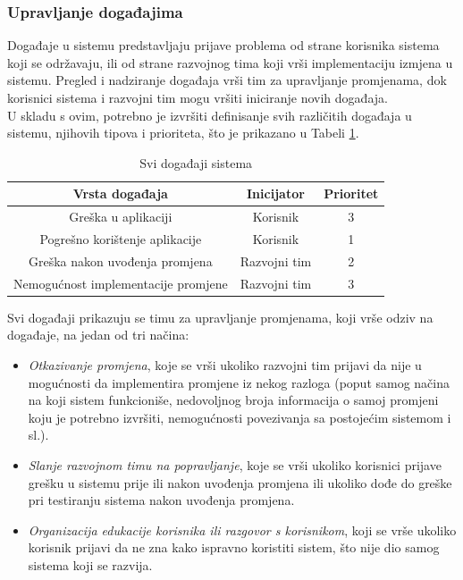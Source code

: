 \documentclass[12pt,a4paper]{article}
\begin{document}
\subsubsection{Upravljanje događajima}

\quad Događaje u sistemu predstavljaju prijave problema od strane korisnika sistema koji se održavaju, ili od strane razvojnog tima koji vrši implementaciju izmjena u sistemu. Pregled i nadziranje događaja vrši tim za upravljanje promjenama, dok korisnici sistema i razvojni tim mogu vršiti iniciranje novih događaja. \\

U skladu s ovim, potrebno je izvršiti definisanje svih različitih događaja u sistemu, njihovih tipova i prioriteta, što je prikazano u Tabeli \ref{tabela1}.

\begin{table}[H]
\centering
\begin{tabular}{| c | c | c |} \hline
\cellcolor{gray!25}\textbf{Vrsta događaja}		& \cellcolor{gray!25}\textbf{Inicijator}			& \cellcolor{gray!25}\textbf{Prioritet} 			\\ \hline
Greška u aplikaciji									& \cellcolor{green!25}Korisnik						& \cellcolor{blue!15}3							\\ \hline
Pogrešno korištenje aplikacije						& \cellcolor{green!25}Korisnik						& \cellcolor{blue!15}1							\\ \hline
Greška nakon uvođenja promjena					& \cellcolor{yellow!25}Razvojni tim				& \cellcolor{blue!35}2							\\ \hline
Nemogućnost implementacije promjene			& \cellcolor{yellow!25}Razvojni tim				& \cellcolor{blue!15}3							\\ \hline
\end{tabular}
\caption{Svi događaji sistema}
\label{tabela1}
\end{table}

Svi događaji prikazuju se timu za upravljanje promjenama, koji vrše odziv na događaje, na jedan od tri načina:

\begin{itemize}
\renewcommand\labelitemi{-}
\item \textit{Otkazivanje promjena}, koje se vrši ukoliko razvojni tim prijavi da nije u mogućnosti da implementira promjene iz nekog razloga (poput samog načina na koji sistem funkcioniše, nedovoljnog broja informacija o samoj promjeni koju je potrebno izvršiti, nemogućnosti povezivanja sa postojećim sistemom i sl.).
\item \textit{Slanje razvojnom timu na popravljanje}, koje se vrši ukoliko korisnici prijave grešku u sistemu prije ili nakon uvođenja promjena ili ukoliko dođe do greške pri testiranju sistema nakon uvođenja promjena.
\item \textit{Organizacija edukacije korisnika ili razgovor s korisnikom}, koji se vrše ukoliko korisnik prijavi da ne zna kako ispravno koristiti sistem, što nije dio samog sistema koji se razvija.
\end{itemize}
\end{document}
